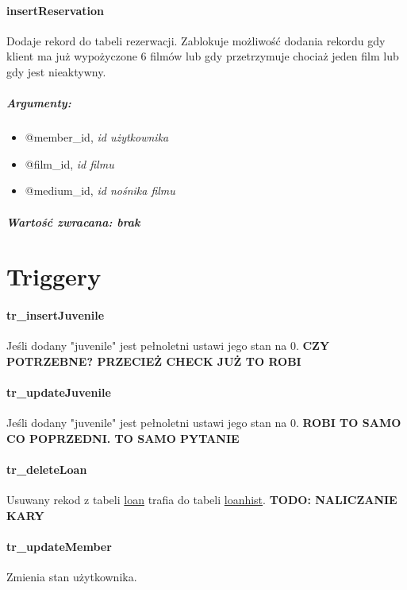 \documentclass[12pt,a4paper,titlepage]{article}
\begin{document}
\paragraph{insertReservation}
Dodaje rekord do tabeli rezerwacji. Zablokuje możliwość dodania rekordu gdy klient ma już wypożyczone 6 filmów lub gdy przetrzymuje chociaż jeden film lub gdy jest nieaktywny.
\subparagraph{Argumenty:}
\begin{itemize}
	\item @member\_id, \textit{id użytkownika}
	\item @film\_id, \textit{id filmu}
	\item @medium\_id, \textit{id nośnika filmu}
\end{itemize}
\subparagraph{Wartość zwracana: brak}




\section{Triggery}

\paragraph{tr\_insertJuvenile}
Jeśli dodany "juvenile" jest pełnoletni ustawi jego stan na 0.
\textbf{CZY POTRZEBNE? PRZECIEŻ CHECK JUŻ TO ROBI}

\paragraph{tr\_updateJuvenile}
Jeśli dodany "juvenile" jest pełnoletni ustawi jego stan na 0.
\textbf{ROBI TO SAMO CO POPRZEDNI. TO SAMO PYTANIE}

\paragraph{tr\_deleteLoan}
Usuwany rekod z tabeli \underline{loan} trafia do tabeli \underline{loanhist}.
\textbf{TODO: NALICZANIE KARY}

\paragraph{tr\_updateMember}
Zmienia stan użytkownika.
\end{document}
